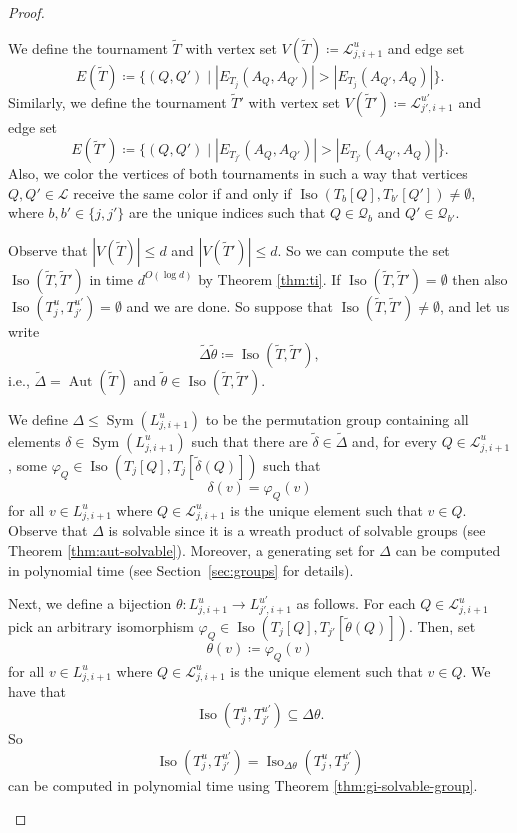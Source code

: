 \documentclass{theoretics}
\newcommand{\CL}{{\mathcal L}}
\newcommand{\CQ}{{\mathcal Q}}
\newcommand{\Bigmid}{\;\Big|\;}
\DeclareMathOperator{\Aut}{Aut}
\DeclareMathOperator{\Iso}{Iso}
\DeclareMathOperator{\Sym}{Sym}
\begin{document}
\begin{proof}
\begin{subproof}
  We define the tournament $\widetilde{T}$ with vertex set $V(\widetilde{T}) \coloneqq \CL_{j,i+1}^{u}$ and edge set
  \[E(\widetilde{T}) \coloneqq \Big\{(Q,Q') \Bigmid |E_{T_j}(A_Q,A_{Q'})| > |E_{T_j}(A_{Q'},A_Q)|\Big\}.\]
  Similarly, we define the tournament $\widetilde{T}'$ with vertex set
  $V(\widetilde{T}') \coloneqq \CL_{j',i+1}^{u'}$ and edge set
  \[E(\widetilde{T}') \coloneqq \Big\{(Q,Q') \Bigmid |E_{T_{j'}}(A_Q,A_{Q'})| > |E_{T_{j'}}(A_{Q'},A_Q)|\Big\}.\]
  Also, we color the vertices of both tournaments in such a way that vertices $Q,Q' \in \CL$ receive the same color if and only if $\Iso(T_b[Q],T_{b'}[Q']) \neq \emptyset$, where $b,b' \in \{j,j'\}$ are the unique indices such that $Q \in \CQ_b$ and $Q' \in \CQ_{b'}$.

  Observe that $|V(\widetilde{T})| \leq d$ and $|V(\widetilde{T}')| \leq d$.
  So we can compute the set $\Iso(\widetilde{T},\widetilde{T}')$ in time $d^{O(\log d)}$ by Theorem \ref{thm:ti}.
  If $\Iso(\widetilde{T},\widetilde{T}') = \emptyset$ then also $\Iso(T_j^u,T_{j'}^{u'}) = \emptyset$ and we are done.
  So suppose that $\Iso(\widetilde{T},\widetilde{T}') \neq \emptyset$, and let us write
  \[\widetilde{\Delta}\widetilde{\theta} \coloneqq \Iso(\widetilde{T},\widetilde{T}'),\]
  i.e., $\widetilde{\Delta} = \Aut(\widetilde{T})$ and $\widetilde{\theta} \in \Iso(\widetilde{T},\widetilde{T}')$.

  We define $\Delta \leq \Sym(L_{j,i+1}^{u})$ to be the permutation group containing all elements $\delta \in \Sym(L_{j,i+1}^{u})$ such that there are $\widetilde{\delta} \in \widetilde{\Delta}$ and, for every $Q \in \CL_{j,i+1}^{u}$, some $\varphi_Q \in \Iso(T_j[Q],T_j[\widetilde{\delta}(Q)])$ such that
  \[\delta(v) = \varphi_Q(v)\]
  for all $v \in L_{j,i+1}^{u}$ where $Q \in \CL_{j,i+1}^{u}$ is the unique element such that $v \in Q$.
  Observe that $\Delta$ is solvable since it is a wreath product of solvable groups (see Theorem \ref{thm:aut-solvable}).
  Moreover, a generating set for $\Delta$ can be computed in polynomial time (see Section~\ref{sec:groups} for details).

  Next, we define a bijection $\theta\colon L_{j,i+1}^{u} \to L_{j',i+1}^{u'}$ as follows.
  For each $Q \in \CL_{j,i+1}^{u}$ pick an arbitrary isomorphism $\varphi_Q \in \Iso(T_j[Q],T_{j'}[\widetilde{\theta}(Q)])$.
  Then, set
  \[\theta(v) \coloneqq \varphi_Q(v)\]
  for all $v \in L_{j,i+1}^{u}$ where $Q \in \CL_{j,i+1}^{u}$ is the unique element such that $v \in Q$.
  We have that
  \[\Iso(T_j^u,T_{j'}^{u'}) \subseteq \Delta\theta.\]
  So
  \[\Iso(T_j^u,T_{j'}^{u'}) = \Iso_{\Delta\theta}(T_j^u,T_{j'}^{u'})\]
  can be computed in polynomial time using Theorem \ref{thm:gi-solvable-group}.
 \end{subproof}


\end{proof}
\end{document}
